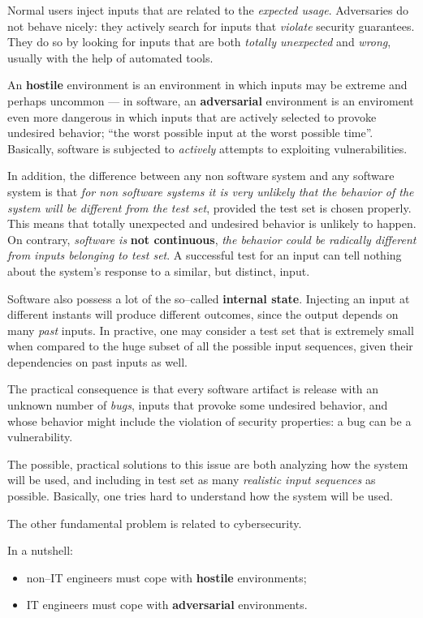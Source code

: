 \documentclass[10pt]{\classname}
\begin{document}
Normal users inject inputs that are related to the \emph{expected usage}.
Adversaries do not behave nicely: they actively search for inputs that
\emph{violate} security guarantees. They do so by looking for inputs that are
both \emph{totally unexpected} and \emph{wrong}, usually with the help of
automated tools.

An \textbf{hostile} environment is an environment in which inputs may be
extreme and perhaps uncommon --- in software, an \textbf{adversarial}
environment is an enviroment even more dangerous in which inputs that are
actively selected to provoke undesired behavior; ``the worst possible input at
the worst possible time''. Basically, software is subjected to \emph{actively}
attempts to exploiting vulnerabilities.

In addition, the difference between any non software system and any software
system is that \emph{for non software systems it is very unlikely that the
behavior of the system will be different from the test set}, provided the test
set is chosen properly. This means that totally unexpected and undesired
behavior is unlikely to happen. On contrary, \emph{software is }\textbf{not
continuous}, \emph{the behavior could be radically different from inputs
belonging to test set}. A successful test for an input can tell nothing about
the system's response to a similar, but distinct, input.

Software also possess a lot of the so--called \textbf{internal state}.
Injecting an input at different instants will produce different outcomes, since
the output depends on many \emph{past} inputs. In practive, one may consider a
test set that is extremely small when compared to the huge subset of all the
possible input sequences, given their dependencies on past inputs as well.

The practical consequence is that every software artifact is release with an
unknown number of \emph{bugs}, inputs that provoke some undesired behavior, and
whose behavior might include the violation of security properties: a bug can be
a vulnerability.

The possible, practical solutions to this issue are both analyzing how the
system will be used, and including in test set as many \emph{realistic input
sequences} as possible. Basically, one tries hard to understand how the system
will be used.

The other fundamental problem is related to cybersecurity.

In a nutshell:
\begin{itemize}
    \item non--IT engineers must cope with \textbf{hostile} environments;
    \item IT engineers must cope with \textbf{adversarial} environments.
\end{itemize}
\end{document}
